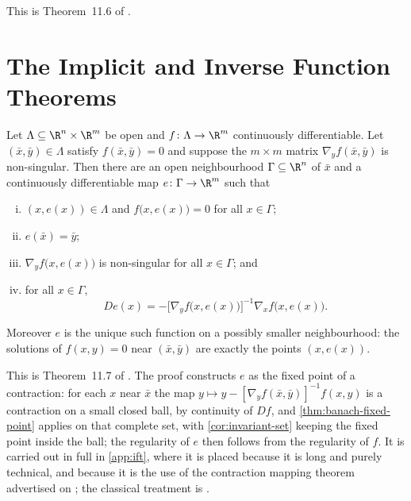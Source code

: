 This is Theorem~11.6 of \textcite[p.~415]{fukuda2026notes}.

\section{The Implicit and Inverse Function Theorems}\label{sec:cn-ift}

\begin{theorem}\label{thm:implicit-function}
	Let $\Lambda\subseteq\R^n\times\R^m$ be open and $f\colon\Lambda\to\R^m$
	continuously differentiable. Let $(\bar x,\bar y)\in\Lambda$ satisfy
	$f(\bar x,\bar y)=0$ and suppose the $m\times m$ matrix
	$\nabla_yf(\bar x,\bar y)$ is non-singular. Then there are an open neighbourhood
	$\Gamma\subseteq\R^n$ of $\bar x$ and a continuously differentiable map
	$e\colon\Gamma\to\R^m$ such that
	\begin{enumerate}[(i)]
		\item $(x,e(x))\in\Lambda$ and $f\bigl(x,e(x)\bigr)=0$ for all $x\in\Gamma$;
		\item $e(\bar x)=\bar y$;
		\item $\nabla_yf\bigl(x,e(x)\bigr)$ is non-singular for all $x\in\Gamma$; and
		\item for all $x\in\Gamma$,
		      \begin{equation}\label{eq:ift-derivative}
			      De(x)=-\bigl[\nabla_yf\bigl(x,e(x)\bigr)\bigr]^{-1}
			      \nabla_xf\bigl(x,e(x)\bigr).
		      \end{equation}
	\end{enumerate}
	Moreover $e$ is the unique such function on a possibly smaller neighbourhood:
	the solutions of $f(x,y)=0$ near $(\bar x,\bar y)$ are exactly the points
	$(x,e(x))$.
\end{theorem}

This is Theorem~11.7 of \textcite[p.~419]{fukuda2026notes}. The proof constructs
$e$ as the fixed point of a contraction: for each $x$ near $\bar x$ the map
$y\mapsto y-[\nabla_yf(\bar x,\bar y)]^{-1}f(x,y)$ is a contraction on a small
closed ball, by continuity of $Df$, and \autoref{thm:banach-fixed-point} applies
on that complete set, with \autoref{cor:invariant-set} keeping the fixed point
inside the ball; the regularity of $e$ then follows from the regularity of $f$.
It is carried out in full in \autoref{app:ift}, where it is placed because it is
long and purely technical, and because it is the use of the contraction
mapping theorem advertised on \autocite[slide 65]{fukuda2026analysis}; the
classical treatment is \textcite[Thm.~9.28]{rudin1976principles}.

